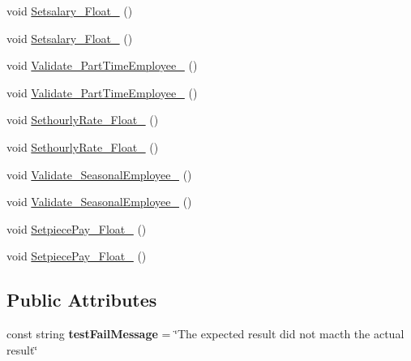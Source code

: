 \begin{DoxyCompactItemize}
void \hyperlink{class_unit_test___e_m_s_1_1_employee_test_a25307524f76e0a926e5b031f133ef3bc}{Setsalary\-\_\-\-Float\-\_} ()
\item 
void \hyperlink{class_unit_test___e_m_s_1_1_employee_test_a9108b531dbb852d57b5dca8f7e2b1c52}{Setsalary\-\_\-\-Float\-\_} ()
\item 
void \hyperlink{class_unit_test___e_m_s_1_1_employee_test_ab857efbc88e58ac595b1f689169dd41c}{Validate\-\_\-\-Part\-Time\-Employee\-\_} ()
\item 
void \hyperlink{class_unit_test___e_m_s_1_1_employee_test_adbd6a0b99a77fa10775d501fa61b1b50}{Validate\-\_\-\-Part\-Time\-Employee\-\_} ()
\item 
void \hyperlink{class_unit_test___e_m_s_1_1_employee_test_af81a3ad9f2c37dc6398bad05d939938f}{Sethourly\-Rate\-\_\-\-Float\-\_} ()
\item 
void \hyperlink{class_unit_test___e_m_s_1_1_employee_test_a0f1ad139e05db974c1a352379ae23d58}{Sethourly\-Rate\-\_\-\-Float\-\_} ()
\item 
void \hyperlink{class_unit_test___e_m_s_1_1_employee_test_acdcf619eddfb0e9e373e7679fb0a1671}{Validate\-\_\-\-Seasonal\-Employee\-\_} ()
\item 
void \hyperlink{class_unit_test___e_m_s_1_1_employee_test_a6a57749082a09aba123364c1d851c3c4}{Validate\-\_\-\-Seasonal\-Employee\-\_} ()
\item 
void \hyperlink{class_unit_test___e_m_s_1_1_employee_test_a14f4949f961f4abe04d399886ae41c33}{Setpiece\-Pay\-\_\-\-Float\-\_} ()
\item 
void \hyperlink{class_unit_test___e_m_s_1_1_employee_test_a8939057327fe57f004fa9f9aa1ef4599}{Setpiece\-Pay\-\_\-\-Float\-\_} ()
\end{DoxyCompactItemize}
\subsection*{Public Attributes}
\begin{DoxyCompactItemize}
\item 
\hypertarget{class_unit_test___e_m_s_1_1_employee_test_a0422010806126dcbb31cab817d8ce6b7}{const string {\bfseries test\-Fail\-Message} = \char`\"{}The expected result did not macth the actual result\char`\"{}}\label{class_unit_test___e_m_s_1_1_employee_test_a0422010806126dcbb31cab817d8ce6b7}

\end{DoxyCompactItemize}


